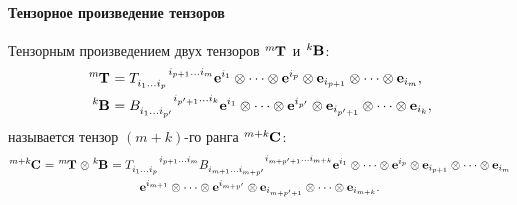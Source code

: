 \paragraph{Тензорное произведение тензоров}
Тензорным произведением двух тензоров $\tensor[^m]{\mathbf{T}}{}$ и $\tensor[^k]{\mathbf{B}}{}$:
\begin{align*}
	\tensor[^m]{\mathbf{T}}{} &= \tensor{T}{_{i_1\dots i_p}^{i_{p+1}\dots i_m}}\mathbf{e}^{i_1}\otimes\dots\otimes\mathbf{e}^{i_p}\otimes\mathbf{e}_{i_{p+1}}\otimes\dots\otimes\mathbf{e}_{i_m},\\
	\tensor[^k]{\mathbf{B}}{} &= \tensor{B}{_{i_1\dots i_{p'}}^{i_{p'+1}\dots i_k}}\mathbf{e}^{i_1}\otimes\dots\otimes\mathbf{e}^{i_{p'}}\otimes\mathbf{e}_{i_{p'+1}}\otimes\dots\otimes\mathbf{e}_{i_k},
\end{align*}
называется тензор $(m+k)$-го ранга $\tensor[^{m+k}]{\mathbf{C}}{}$:
\begin{multline*}
	\tensor[^{m+k}]{\mathbf{C}}{} = \tensor[^m]{\mathbf{T}}{}\otimes\tensor[^k]{\mathbf{B}}{}=
	\tensor{T}{_{i_1\dots i_p}^{i_{p+1}\dots i_m}}\tensor{B}{_{i_{m+1}\dots i_{m+p'}}^{i_{m+p'+1}\dots i_{m+k}}}\mathbf{e}^{i_1}\otimes\dots\otimes\mathbf{e}^{i_p}\otimes\mathbf{e}_{i_{p+1}}\otimes\dots\otimes\mathbf{e}_{i_m}\\
	\mathbf{e}^{i_{m+1}}\otimes\dots\otimes\mathbf{e}^{i_{m+p'}}\otimes\mathbf{e}_{i_{m+p'+1}}\otimes\dots\otimes\mathbf{e}_{i_{m+k}}.
\end{multline*}
